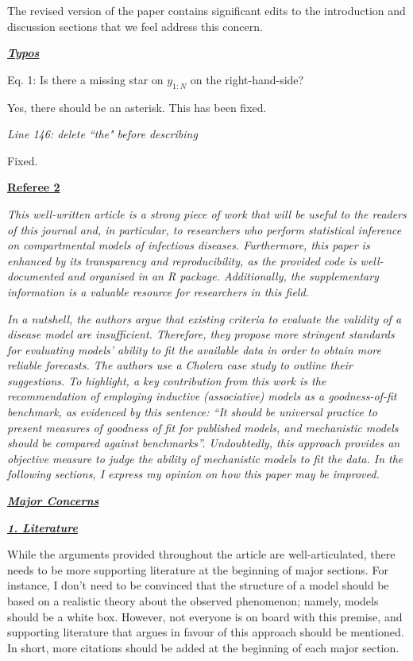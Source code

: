 \documentclass[11pt]{article}
\newcommand\report[1]{{\color{mygreen} \vspace{1mm}\hspace{0.25in}\parbox{6in}{\em #1}}}
\begin{document}
The revised version of the paper contains significant edits to the introduction and discussion sections that we feel address this concern.

\report{
  \textbf{\underline{Typos}}

  Eq. 1: Is there a missing star on $y_{1:N}$ on the right-hand-side?
}

Yes, there should be an asterisk. This has been fixed.

\report{
  Line 146: delete ``the" before describing
}

Fixed.

\newpage


\begin{center}
{\large{\textbf{\underline{Referee 2}}}} %
\end{center}


\report{
  This well-written article is a strong piece of work that will be useful to the readers of this journal and, in particular, to researchers who perform statistical inference on compartmental models of infectious diseases. Furthermore, this paper is enhanced by its transparency and reproducibility, as the provided code is well-documented and organised in an R package. Additionally, the supplementary information is a valuable resource for researchers in this field.
}

\report{
  In a nutshell, the authors argue that existing criteria to evaluate the validity of a disease model are insufficient. Therefore, they propose more stringent standards for evaluating models’ ability to fit the available data in order to obtain more reliable forecasts. The authors use a Cholera case study to outline their suggestions. To highlight, a key contribution from this work is the recommendation of employing inductive (associative) models as a goodness-of-fit benchmark, as evidenced by this sentence: “It should be universal practice to present measures of goodness of fit for published models, and mechanistic models should be compared against benchmarks”. Undoubtedly, this approach provides an objective measure to judge the ability of mechanistic models to fit the data. In the following sections, I express my opinion on how this paper may be improved.
}

\report{
\textbf{\underline{Major Concerns}}
}

\report{
  \textbf{\underline{1. Literature}}

While the arguments provided throughout the article are well-articulated, there needs to be more supporting literature at the beginning of major sections. For instance, I don’t need to be convinced that the structure of a model should be based on a realistic theory about the observed phenomenon; namely, models should be a white box. However, not everyone is on board with this premise, and supporting literature that argues in favour of this approach should be mentioned. In short, more citations should be added at the beginning of each major section.
}
\end{document}
